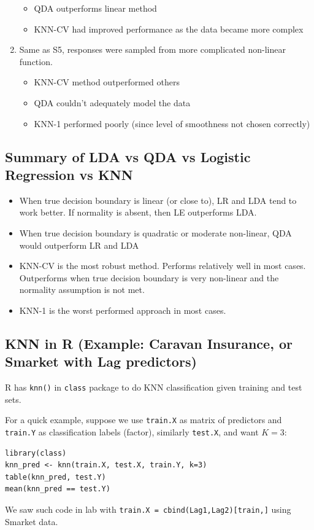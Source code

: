 \documentclass[11pt]{article}
\begin{document}
\begin{enumerate}
        \begin{itemize}
            \item QDA outperforms linear method
            \item KNN-CV had improved performance as the data became more complex
        \end{itemize}
    \item Same as S5, responses were sampled from more complicated non-linear function.
        \begin{itemize}
            \item KNN-CV method outperformed others
            \item QDA couldn't adequately model the data
            \item KNN-1 performed poorly (since level of smoothness not chosen correctly)
        \end{itemize}
\end{enumerate}

\subsection{Summary of LDA vs QDA vs Logistic Regression vs KNN}
\begin{itemize}
    \item When true decision boundary is linear (or close to), LR and LDA tend to work better. If normality is absent, then LE outperforms LDA.
    \item When true decision boundary is quadratic or moderate non-linear, QDA would outperform LR and LDA
    \item KNN-CV is the most robust method. Performs relatively well in most cases. Outperforms when true decision boundary is very non-linear and the normality assumption is not met.
    \item KNN-1 is the worst performed approach in most cases.
\end{itemize}

\subsection{KNN in R (Example: Caravan Insurance, or Smarket with Lag predictors)}
R has \texttt{knn()} in \texttt{class} package to do KNN classification given training and test sets.

For a quick example, suppose we use \texttt{train.X} as matrix of predictors and \texttt{train.Y} as classification labels (factor), similarly \texttt{test.X}, and want $K=3$:
\begin{verbatim}
library(class)
knn_pred <- knn(train.X, test.X, train.Y, k=3)
table(knn_pred, test.Y)
mean(knn_pred == test.Y)
\end{verbatim}
We saw such code in lab with \texttt{train.X = cbind(Lag1,Lag2)[train,]} using Smarket data.
\end{document}
